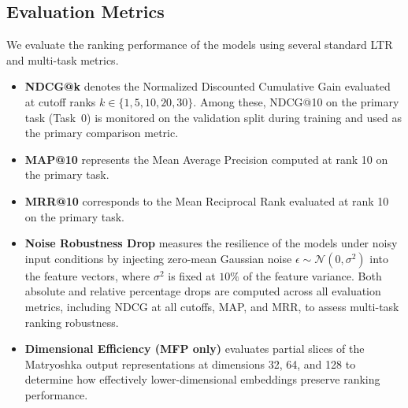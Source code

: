 \begin{table}[!htbp]
  \centering
  \caption{\label{tab:weights} Task weight configurations for linear scalarization.}
\end{table}

\subsection{Evaluation Metrics}

We evaluate the ranking performance of the models using several standard LTR and multi-task metrics.

\begin{itemize}
    \item \textbf{NDCG@k} denotes the Normalized Discounted Cumulative Gain evaluated at cutoff ranks $k \in \{1, 5, 10, 20, 30\}$. Among these, NDCG@10 on the primary task (Task~0) is monitored on the validation split during training and used as the primary comparison metric.
    \item \textbf{MAP@10} represents the Mean Average Precision computed at rank 10 on the primary task.
    \item \textbf{MRR@10} corresponds to the Mean Reciprocal Rank evaluated at rank 10 on the primary task.
    \item \textbf{Noise Robustness Drop} measures the resilience of the models under noisy input conditions by injecting zero-mean Gaussian noise $\epsilon \sim \mathcal{N}(0, \sigma^2)$ into the feature vectors, where $\sigma^2$ is fixed at $10\%$ of the feature variance. Both absolute and relative percentage drops are computed across all evaluation metrics, including NDCG at all cutoffs, MAP, and MRR, to assess multi-task ranking robustness.
    \item \textbf{Dimensional Efficiency (MFP only)} evaluates partial slices of the Matryoshka output representations at dimensions 32, 64, and 128 to determine how effectively lower-dimensional embeddings preserve ranking performance.
\end{itemize}